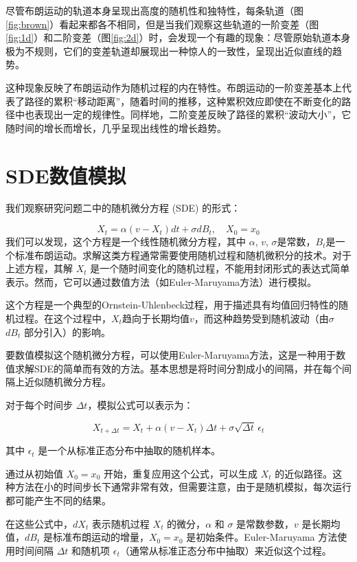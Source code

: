 \documentclass[12pt,a4paper]{article}
\begin{document}
尽管布朗运动的轨道本身呈现出高度的随机性和独特性，每条轨道（图\ref{fig:brown}）看起来都各不相同，但是当我们观察这些轨道的一阶变差（图\ref{fig:1d}）和二阶变差（图\ref{fig:2d}）时，会发现一个有趣的现象：尽管原始轨道本身极为不规则，它们的变差轨道却展现出一种惊人的一致性，呈现出近似直线的趋势。

这种现象反映了布朗运动作为随机过程的内在特性。布朗运动的一阶变差基本上代表了路径的累积“移动距离”，随着时间的推移，这种累积效应即使在不断变化的路径中也表现出一定的规律性。同样地，二阶变差反映了路径的累积“波动大小”，它随时间的增长而增长，几乎呈现出线性的增长趋势。



\section{SDE数值模拟}

我们观察研究问题二中的随机微分方程 (SDE) 的形式：

\begin{equation}
   X_t = \alpha (v - X_t) dt + \sigma dB_t, \quad X_0 = x_0 
\end{equation} 
我们可以发现，这个方程是一个线性随机微分方程，其中 $\alpha$, $v$, $\sigma$是常数，$B_t$是一个标准布朗运动。求解这类方程通常需要使用随机过程和随机微积分的技术。对于上述方程，其解 $X_t$ 是一个随时间变化的随机过程，不能用封闭形式的表达式简单表示。然而，它可以通过数值方法（如Euler-Maruyama方法）进行模拟。

这个方程是一个典型的Ornstein-Uhlenbeck过程，用于描述具有均值回归特性的随机过程。在这个过程中，$X_t$趋向于长期均值$v$，而这种趋势受到随机波动（由$\sigma$ $dB_t$ 部分引入）的影响。

要数值模拟这个随机微分方程，可以使用Euler-Maruyama方法，这是一种用于数值求解SDE的简单而有效的方法。基本思想是将时间分割成小的间隔，并在每个间隔上近似随机微分方程。

对于每个时间步 \( \Delta t \)，模拟公式可以表示为：

\[ X_{t+\Delta t} = X_t + \alpha(v - X_t)\Delta t + \sigma \sqrt{\Delta t} \, \epsilon_t \]

其中 \( \epsilon_t \) 是一个从标准正态分布中抽取的随机样本。

通过从初始值 \( X_0 = x_0 \) 开始，重复应用这个公式，可以生成 \( X_t \) 的近似路径。这种方法在小的时间步长下通常非常有效，但需要注意，由于是随机模拟，每次运行都可能产生不同的结果。


在这些公式中，\(dX_t\) 表示随机过程 \(X_t\) 的微分，\(\alpha\) 和 \(\sigma\) 是常数参数，\(v\) 是长期均值，\(dB_t\) 是标准布朗运动的增量，\(X_0 = x_0\) 是初始条件。Euler-Maruyama 方法使用时间间隔 \(\Delta t\) 和随机项 \(\epsilon_t\)（通常从标准正态分布中抽取）来近似这个过程。
\end{document}
